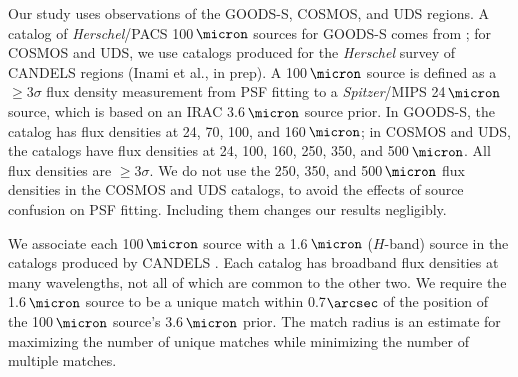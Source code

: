 \documentclass[preprint]{aastex}
\begin{document}
Our study uses observations of the GOODS-S, COSMOS, and UDS regions.  A
catalog of \emph{Herschel}/PACS 100$\,\micron$ sources for GOODS-S comes from
\citet{magnelli13}; for COSMOS and UDS, we use catalogs produced for the
\emph{Herschel} survey of CANDELS regions (Inami et al., in prep).  A
100$\,\micron$ source is defined as a $\ge 3\sigma$ flux density measurement
from PSF fitting to a \emph{Spitzer}/MIPS 24$\,\micron$ source, which is based
on an IRAC 3.6$\,\micron$ source prior.  In GOODS-S, the catalog has
flux densities at 24, 70, 100, and 160$\,\micron$; in COSMOS and
UDS, the catalogs have flux densities at 24, 100, 160, 250, 350,
and 500$\,\micron$.  All flux densities are $\ge 3\sigma$.  We do not use the
250, 350, and 500$\,\micron$ flux
densities in the COSMOS and UDS catalogs, to avoid the effects of source
confusion on PSF fitting.  Including them changes our results negligibly.

We associate each 100$\,\micron$ source with a 1.6$\,\micron$ ($H$-band) source
in the
catalogs produced by CANDELS
\citep[Nayyeri et al., in prep;][]{galametz13,guo13}.  Each catalog has
broadband flux densities at many wavelengths, not all of which are common to the
other two.  We require the 1.6$\,\micron$ source to be a unique match
within 0.7$\arcsec$ of the position of the 100$\,\micron$ source's
3.6$\,\micron$ prior.  The match radius is an estimate for maximizing the
number of unique matches while minimizing the number of multiple matches.
\end{document}
